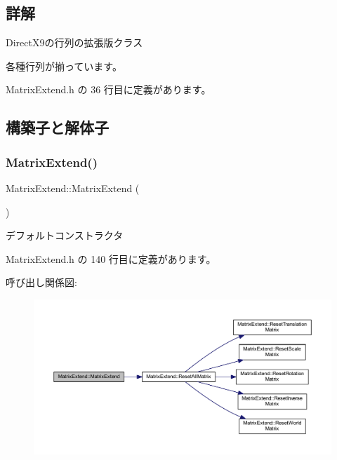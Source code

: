 \subsection{詳解}
Direct\+X9の行列の拡張版クラス 

各種行列が揃っています。 

 Matrix\+Extend.\+h の 36 行目に定義があります。



\subsection{構築子と解体子}
\mbox{\label{class_matrix_extend_a0058bf9dcf42d7f0c53b6fb3559b6a6e}} 
\subsubsection{\texorpdfstring{Matrix\+Extend()}{MatrixExtend()}}
{\footnotesize\ttfamily Matrix\+Extend\+::\+Matrix\+Extend (\begin{DoxyParamCaption}{ }\end{DoxyParamCaption})\hspace{0.3cm}{\ttfamily [inline]}}



デフォルトコンストラクタ 


\begin{DoxyItemize}
\item 
\end{DoxyItemize}

 Matrix\+Extend.\+h の 140 行目に定義があります。

呼び出し関係図\+:\nopagebreak
\begin{figure}[H]
\begin{center}
\leavevmode
\includegraphics[width=350pt]{class_matrix_extend_a0058bf9dcf42d7f0c53b6fb3559b6a6e_cgraph}
\end{center}
\end{figure}
\mbox{\label{class_matrix_extend_ae1d80dfa20420bdc58e85eccc525fe91}} 
